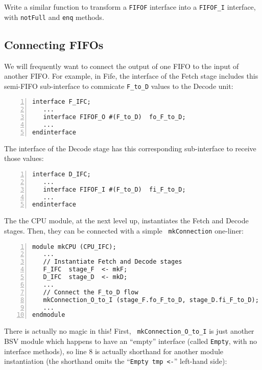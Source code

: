 \hdivider

\Exercise

Write a similar function to transform a \verb|FIFOF| interface into a
\verb|FIFOF_I| interface, with \verb|notFull| and \verb|enq| methods.

\Endexercise


\subsection{Connecting FIFOs}

\label{Sec_connecting_FIFOs}


We will frequently want to connect the output of one FIFO to the input
of another FIFO.  For example, in Fife, the interface of the Fetch
stage includes this semi-FIFO sub-interface to commicate \verb|F_to_D|
values to the Decode unit:

{\small
\begin{Verbatim}[frame=single, numbers=left]
interface F_IFC;
   ...
   interface FIFOF_O #(F_to_D)  fo_F_to_D;
   ...
endinterface
\end{Verbatim}
}

The interface of the Decode stage has this corresponding sub-interface
to receive those values:

{\small
\begin{Verbatim}[frame=single, numbers=left]
interface D_IFC;
   ...
   interface FIFOF_I #(F_to_D)  fi_F_to_D;
   ...
endinterface
\end{Verbatim}
}

The the CPU module, at the next level up, instantiates the Fetch and
Decode stages.  Then, they can be connected with a simple {\tt
mkConnection} one-liner:

{\small
\begin{Verbatim}[frame=single, numbers=left]
module mkCPU (CPU_IFC);
   ...
   // Instantiate Fetch and Decode stages
   F_IFC  stage_F  <- mkF;
   D_IFC  stage_D  <- mkD;
   ...
   // Connect the F_to_D flow
   mkConnection_O_to_I (stage_F.fo_F_to_D, stage_D.fi_F_to_D);
   ...
endmodule
\end{Verbatim}
}

There is actually no magic in this!  First, {\tt
mkConnection\_O\_to\_I} is just another BSV module which happens to
have an ``empty'' interface (called {\tt Empty}, with no interface
methods), so line 8 is actually shorthand for another module
instantiation (the shorthand omits the ``{\tt Empty~tmp~<-}''
left-hand side):

